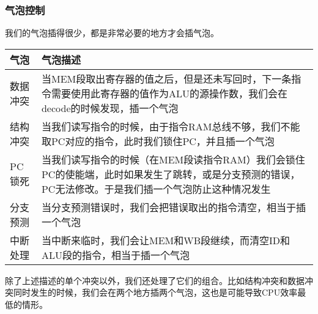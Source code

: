 \subsubsection{气泡控制}

我们的气泡插得很少，都是非常必要的地方才会插气泡。

\begin{center}
    \label{table:bubble}
    \begin{longtable}{p{}p{}}
        \toprule
        气泡 & 气泡描述 \\
        \midrule
        数据冲突 & 当MEM段取出寄存器的值之后，但是还未写回时，下一条指令需要使用此寄存器的值作为ALU的源操作数，我们会在decode的时候发现，插一个气泡\\
        结构冲突 & 当我们读写指令的时候，由于指令RAM总线不够，我们不能取PC对应的指令，此时我们锁住PC，并且插一个气泡\\
        PC锁死 & 当我们读写指令的时候（在MEM段读指令RAM）我们会锁住PC的使能端，此时如果发生了跳转，或是分支预测的错误，PC无法修改。于是我们插一个气泡防止这种情况发生\\
        分支预测 & 当分支预测错误时，我们会把错误取出的指令清空，相当于插一个气泡\\
        中断处理 & 当中断来临时，我们会让MEM和WB段继续，而清空ID和ALU段的指令，相当于插一个气泡\\
        \bottomrule
    \end{longtable}
\end{center}

除了上述描述的单个冲突以外，我们还处理了它们的组合。比如结构冲突和数据冲突同时发生的时候，我们会在两个地方插两个气泡，这也是可能导致CPU效率最低的情形。
